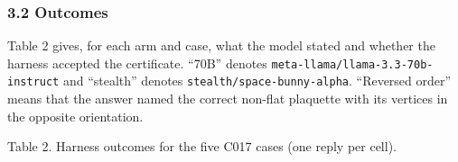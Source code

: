 \documentclass[
  11pt,
]{article}
\begin{document}
\hypertarget{outcomes}{%
\subsubsection{3.2 Outcomes}\label{outcomes}}

Table 2 gives, for each arm and case, what the model stated and whether
the harness accepted the certificate. ``70B'' denotes
\texttt{meta-\allowbreak{}llama/\allowbreak{}llama-\allowbreak{}3.3-\allowbreak{}70b-\allowbreak{}instruct}
and ``stealth'' denotes
\texttt{stealth/\allowbreak{}space-\allowbreak{}bunny-\allowbreak{}alpha}.
``Reversed order'' means that the answer named the correct non-flat
plaquette with its vertices in the opposite orientation.


Table 2. Harness outcomes for the five C017 cases (one reply per cell).
\end{document}
